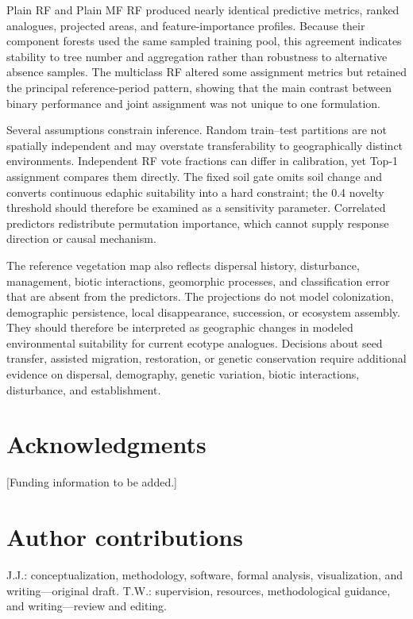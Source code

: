 \documentclass[11pt]{article}
\begin{document}
Plain RF and Plain MF RF produced nearly identical predictive metrics, ranked
analogues, projected areas, and feature-importance profiles. Because their
component forests used the same sampled training pool, this agreement indicates
stability to tree number and aggregation rather than robustness to alternative
absence samples. The multiclass RF altered some assignment metrics but retained
the principal reference-period pattern, showing that the main contrast between
binary performance and joint assignment was not unique to one formulation.

Several assumptions constrain inference. Random train--test partitions are not
spatially independent and may overstate transferability to geographically
distinct environments. Independent RF vote fractions can differ in
calibration, yet Top-1 assignment compares them directly. The fixed soil gate
omits soil change and converts continuous edaphic suitability into a hard
constraint; the 0.4 novelty threshold should therefore be examined as a
sensitivity parameter. Correlated predictors redistribute permutation
importance, which cannot supply response direction or causal mechanism.

The reference vegetation map also reflects dispersal history, disturbance,
management, biotic interactions, geomorphic processes, and classification
error that are absent from the predictors. The projections do not model
colonization, demographic persistence, local disappearance, succession, or
ecosystem assembly. They should therefore be interpreted as geographic changes
in modeled environmental suitability for current ecotype analogues. Decisions
about seed transfer, assisted migration, restoration, or genetic conservation
require additional evidence on dispersal, demography, genetic variation,
biotic interactions, disturbance, and establishment.

\section*{Acknowledgments}
[Funding information to be added.]

\section*{Author contributions}
J.J.: conceptualization, methodology, software, formal analysis,
visualization, and writing---original draft. T.W.: supervision, resources,
methodological guidance, and writing---review and editing.
\end{document}
